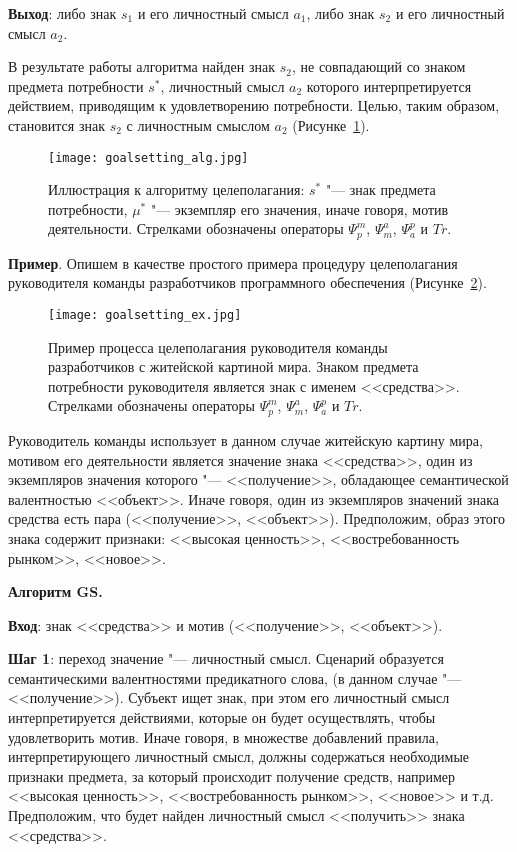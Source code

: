 \begin{appendices}
\textbf{Выход}: либо знак $s_1$ и его личностный смысл $a_1$, либо знак $s_2$ и его личностный смысл $a_2$.

В результате работы алгоритма найден знак $s_2$, не совпадающий со знаком предмета потребности $s^*$, личностный смысл $a_2$ которого интерпретируется действием, приводящим к удовлетворению потребности. Целью, таким образом, становится знак $s_2$ с личностным смыслом $a_2$ (Рисунке~\ref{fg:goalsetting_alg}).

\begin{figure}[h]
	\centering
	\texttt{[image: goalsetting\_alg.jpg]}
	\caption[]{Иллюстрация к алгоритму целеполагания: $s^*$ "--- знак предмета потребности, $\mu^*$ "--- экземпляр его значения, иначе говоря, мотив деятельности. Стрелками обозначены операторы $\Psi_p^m$, $\Psi_m^a$, $\Psi_a^p$ и $Tr$.}
	\label{fg:goalsetting_alg}
\end{figure}

\textbf{Пример}. Опишем в качестве простого примера процедуру целеполагания руководителя команды разработчиков программного обеспечения (Рисунке~\ref{fg:goalsetting_ex}).

\begin{figure}[h]
	\centering
	\texttt{[image: goalsetting\_ex.jpg]}
	\caption[]{Пример процесса целеполагания руководителя команды разработчиков с житейской картиной мира. Знаком предмета потребности руководителя является знак с именем <<средства>>. Стрелками обозначены операторы $\Psi_p^m$, $\Psi_m^a$, $\Psi_a^p$ и $Tr$.}
	\label{fg:goalsetting_ex}
\end{figure}

Руководитель команды использует в данном случае житейскую картину мира, мотивом его деятельности является значение знака <<средства>>, один из экземпляров значения которого "--- <<получение>>, обладающее семантической валентностью <<объект>>. Иначе говоря, один из экземпляров значений знака средства есть пара (<<получение>>, <<объект>>). Предположим, образ этого знака содержит признаки: <<высокая ценность>>, <<востребованность рынком>>, <<новое>>.

\textbf{Алгоритм GS.}

\textbf{Вход}: знак <<средства>> и мотив (<<получение>>, <<объект>>).

\textbf{Шаг 1}: переход значение "--- личностный смысл. Сценарий образуется семантическими валентностями предикатного слова, (в данном случае "--- <<получение>>). Субъект ищет знак, при этом его личностный смысл интерпретируется действиями, которые он будет осуществлять, чтобы удовлетворить мотив. Иначе говоря, в множестве добавлений правила, интерпретирующего личностный смысл, должны содержаться необходимые признаки предмета, за который происходит получение средств, например <<высокая ценность>>, <<востребованность рынком>>, <<новое>> и т.д. Предположим, что будет найден личностный смысл <<получить>> знака <<средства>>.


\end{appendices}
